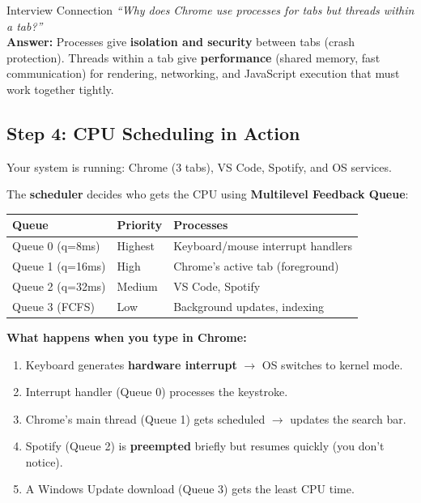 \documentclass[12pt,a4paper]{article}
\begin{document}
\begin{tipbox}{Interview Connection}
\textit{``Why does Chrome use processes for tabs but threads within a tab?''} \\
\textbf{Answer:} Processes give \textbf{isolation and security} between tabs (crash protection). Threads within a tab give \textbf{performance} (shared memory, fast communication) for rendering, networking, and JavaScript execution that must work together tightly.
\end{tipbox}

\subsection{Step 4: CPU Scheduling in Action}

Your system is running: Chrome (3 tabs), VS Code, Spotify, and OS services.

The \textbf{scheduler} decides who gets the CPU using \textbf{Multilevel Feedback Queue}:

\begin{center}
\begin{tabular}{@{} l l l @{}}
\toprule
\textbf{Queue} & \textbf{Priority} & \textbf{Processes} \\
\midrule
Queue 0 (q=8ms) & Highest & Keyboard/mouse interrupt handlers \\
Queue 1 (q=16ms) & High & Chrome's active tab (foreground) \\
Queue 2 (q=32ms) & Medium & VS Code, Spotify \\
Queue 3 (FCFS) & Low & Background updates, indexing \\
\bottomrule
\end{tabular}
\end{center}

\textbf{What happens when you type in Chrome:}
\begin{enumerate}[leftmargin=*]
    \item Keyboard generates \textbf{hardware interrupt} $\rightarrow$ OS switches to kernel mode.
    \item Interrupt handler (Queue 0) processes the keystroke.
    \item Chrome's main thread (Queue 1) gets scheduled $\rightarrow$ updates the search bar.
    \item Spotify (Queue 2) is \textbf{preempted} briefly but resumes quickly (you don't notice).
    \item A Windows Update download (Queue 3) gets the least CPU time.
\end{enumerate}
\end{document}

